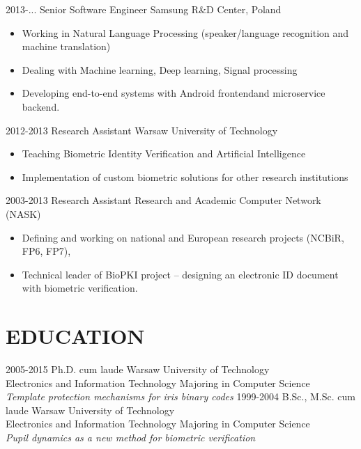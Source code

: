 \documentclass[]{mchcv}
\begin{document}
\begin{twenty}
  \twentyitem
    {2013-...}
    {Senior Software Engineer}
    {Samsung R\&D Center, Poland}
    {
    \begin{itemize}
		\item Working in Natural Language Processing (speaker/language recognition and machine translation)
		\item Dealing with Machine learning, Deep learning, Signal processing
		\item Developing end-to-end systems with Android frontendand microservice backend.
    \end{itemize}
    }
  \twentyitem
    {2012-2013}
    {Research Assistant}
    {Warsaw University of Technology}
    {\begin{itemize}
		\item Teaching Biometric Identity Verification and Artificial Intelligence
		\item Implementation of custom biometric solutions for other research
institutions
     \end{itemize}
    }
  \twentyitem
    {2003-2013}
    {Research Assistant}
    {Research and Academic Computer Network (NASK)}
    {\begin{itemize}
    	\item Defining and working on national and European research projects (NCBiR, FP6, FP7),
	\item Technical leader of BioPKI project – designing an electronic ID document with biometric verification.
	\end{itemize}}
\end{twenty}


\lineseparator{13cm}

\section{EDUCATION}

\begin{twenty}
  \twentyitem
    {2005-2015}
    {Ph.D. cum laude}
    {Warsaw University of Technology\\ Electronics and Information Technology}
    {Majoring in Computer Science\\\textit{Template protection mechanisms for iris binary codes}}
  \twentyitem
    {1999-2004}
    {B.Sc., M.Sc. cum laude}
    {Warsaw University of Technology\\ Electronics and Information Technology}
    {Majoring in Computer Science\\\textit{Pupil dynamics as a new method for biometric verification}}
\end{twenty}
\end{document}
